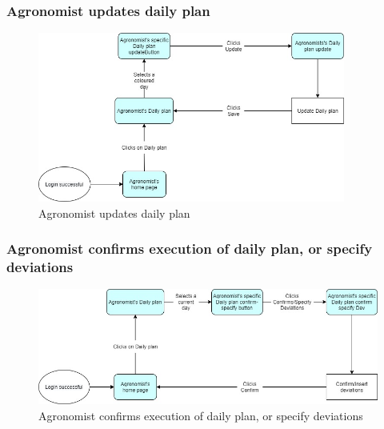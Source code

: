 \documentclass{article}
\begin{document}
        \subsubsection{Agronomist updates daily plan}
            \begin{figure} [h]
                \centering
                \includegraphics[width=0.9\textwidth]{images/UserInterfaces/MapsFunctionalities/16. AgronomistUpdatesDailyPlan.jpg}
                \caption{\label{fig:AgronomistUpdateDailyPlan}Agronomist updates daily plan}
            \end{figure}
        
        
        
    
        \newpage
        
        
        \subsubsection{Agronomist confirms execution of daily plan, or specify deviations}
            \begin{figure} [h]
                \centering
                \includegraphics[width=1\textwidth]{images/UserInterfaces/MapsFunctionalities/18. AgronomistConfirmsExecutionOfDailyPlanOrSpecifiesDeviations.jpg}
                \caption{\label{fig:AgronomistCloseDailyPlan}Agronomist confirms execution of daily plan, or specify deviations}
            \end{figure}
        
\end{document}
